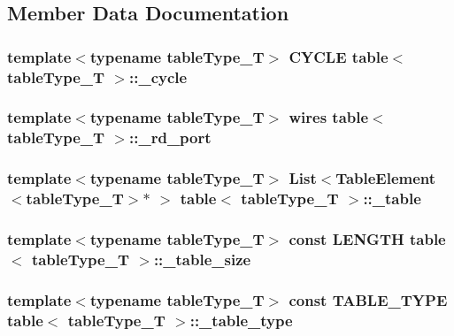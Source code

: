 \subsection{Member Data Documentation}
\hypertarget{classtable_a64d740f2c6bbb938aac4a89bcbd76674}{
\subsubsection[{\_\-cycle}]{\setlength{\rightskip}{0pt plus 5cm}template$<$typename tableType\_\-T$>$ {\bf CYCLE} {\bf table}$<$ tableType\_\-T $>$::{\bf \_\-cycle}}}
\label{classtable_a64d740f2c6bbb938aac4a89bcbd76674}
\hypertarget{classtable_a55194c16991775949c0bc2e2ce0dd1de}{
\subsubsection[{\_\-rd\_\-port}]{\setlength{\rightskip}{0pt plus 5cm}template$<$typename tableType\_\-T$>$ {\bf wires} {\bf table}$<$ tableType\_\-T $>$::{\bf \_\-rd\_\-port}}}
\label{classtable_a55194c16991775949c0bc2e2ce0dd1de}
\hypertarget{classtable_aea78e74d4f44c1879df0c44e69d7bc26}{
\subsubsection[{\_\-table}]{\setlength{\rightskip}{0pt plus 5cm}template$<$typename tableType\_\-T$>$ {\bf List}$<${\bf TableElement}$<$tableType\_\-T$>$$\ast$ $>$ {\bf table}$<$ tableType\_\-T $>$::{\bf \_\-table}}}
\label{classtable_aea78e74d4f44c1879df0c44e69d7bc26}
\hypertarget{classtable_a812d699882bfa6230532dad66a5004bd}{
\subsubsection[{\_\-table\_\-size}]{\setlength{\rightskip}{0pt plus 5cm}template$<$typename tableType\_\-T$>$ const {\bf LENGTH} {\bf table}$<$ tableType\_\-T $>$::{\bf \_\-table\_\-size}}}
\label{classtable_a812d699882bfa6230532dad66a5004bd}
\hypertarget{classtable_ae804042049b8e94591efe22ae05c0371}{
\subsubsection[{\_\-table\_\-type}]{\setlength{\rightskip}{0pt plus 5cm}template$<$typename tableType\_\-T$>$ const {\bf TABLE\_\-TYPE} {\bf table}$<$ tableType\_\-T $>$::{\bf \_\-table\_\-type}}}
